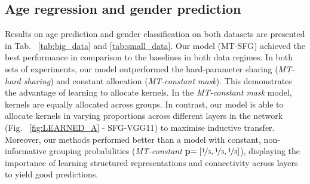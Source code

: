 \subsection{Age regression and gender prediction}
Results on age prediction and gender classification on both datasets are presented in Tab.~ \ref{tab:big_data} and \ref{tab:small_data}. Our model (MT-SFG) achieved the best performance in comparison to the baselines in both data regimes. In both sets of experiments, our model outperformed the hard-parameter sharing (\emph{MT-hard sharing}) and constant allocation (\emph{MT-constant mask}). This demonstrates the advantage of learning to allocate kernels. In the \emph{MT-constant mask} model, kernels are equally allocated across groups. In contrast, our model is able to allocate kernels in varying proportions across different layers in the network (Fig.~ \ref{fig:LEARNED_A} - SFG-VGG11) to maximise inductive transfer. Moreover, our methods performed better than a model with constant, non-informative grouping probabilities (\emph{MT-constant} \textbf{p}$= [\nicefrac{1}{3}, \nicefrac{1}{3}, \nicefrac{1}{3}]$), displaying the importance of learning structured representations and connectivity across layers to yield good predictions.


